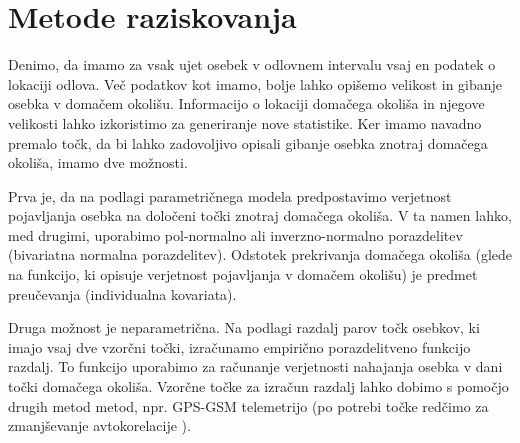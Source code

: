 \documentclass[a4paper]{article}
\begin{document}

\section{Metode raziskovanja}

Denimo, da imamo za vsak ujet osebek v odlovnem intervalu vsaj en podatek o lokaciji odlova. Več podatkov kot imamo, bolje lahko opišemo velikost in gibanje osebka v domačem okolišu. Informacijo o lokaciji domačega okoliša in njegove velikosti lahko izkoristimo za generiranje nove statistike. Ker imamo navadno premalo točk, da bi lahko zadovoljivo opisali gibanje osebka znotraj domačega okoliša, imamo dve možnosti.

Prva je, da na podlagi parametričnega modela predpostavimo verjetnost pojavljanja osebka na določeni točki znotraj domačega okoliša. V ta namen lahko, med drugimi, uporabimo pol-normalno ali inverzno-normalno porazdelitev (bivariatna normalna porazdelitev). Odstotek prekrivanja domačega okoliša (glede na funkcijo, ki opisuje verjetnost pojavljanja v domačem okolišu) je predmet preučevanja (individualna kovariata).

Druga možnost je neparametrična. Na podlagi razdalj parov točk osebkov, ki imajo vsaj dve vzorčni točki, izračunamo empirično porazdelitveno funkcijo razdalj. To funkcijo uporabimo za računanje verjetnosti nahajanja osebka v dani točki domačega okoliša. Vzorčne točke za izračun razdalj lahko dobimo s pomočjo drugih metod metod, npr. GPS-GSM telemetrijo (po potrebi točke redčimo za zmanjševanje avtokorelacije \citep{royle-et-al-2013}).
\end{document}
